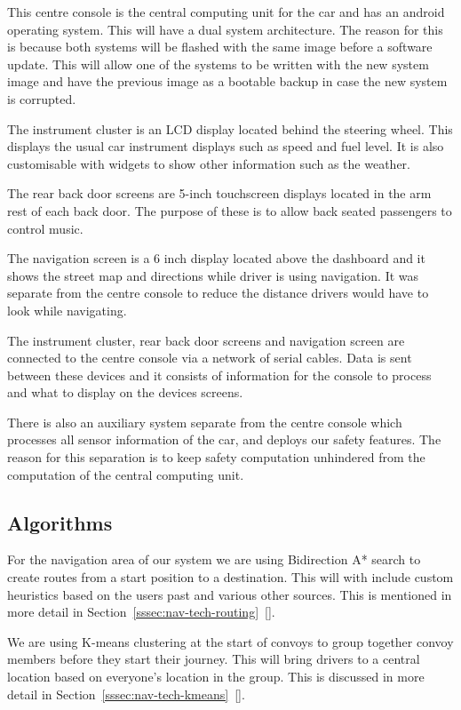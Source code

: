 \documentclass{article}
\begin{document}
This centre console is the central computing unit for the car and has an android operating system. This will have a dual system architecture. The reason for this is because both systems will be flashed with the same image before a software update. This will allow one of the systems to be written with the new system image and have the previous image as a bootable backup in case the new system is corrupted.

The instrument cluster is an LCD display located behind the steering wheel. This displays the usual car instrument displays such as speed and fuel level. It is also customisable with widgets to show other information such as the weather.

The rear back door screens are 5-inch touchscreen displays located in the arm rest of each back door. The purpose of these is to allow back seated passengers to control music.

The navigation screen is a 6 inch display located above the dashboard and it shows the street map and directions while driver is using navigation. It was separate from the centre console to reduce the distance drivers would have to look while navigating.

The instrument cluster, rear back door screens and navigation screen are connected to the centre console via a network of serial cables. Data is sent between these devices and it consists of information for the console to process and what to display on the devices screens.

There is also an auxiliary system separate from the centre console which processes all sensor information of the car, and deploys our safety features. The reason for this separation is to keep safety computation unhindered from the computation of the central computing unit.

\subsection{Algorithms}\label{ssec:algorithms}
For the navigation area of our system we are using Bidirection A* search to create routes from a start position to a destination. This will with include custom heuristics based on the users past and various other sources. This is mentioned in more detail in Section~\ref{sssec:nav-tech-routing}~[].

We are using K-means clustering at the start of convoys to group together convoy members before they start their journey. This will bring drivers to a central location based on everyone's location in the group. This is discussed in more detail in Section~\ref{sssec:nav-tech-kmeans}~[].
\end{document}
